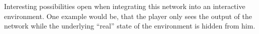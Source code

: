 \documentclass[a4paper, twoside, 10pt]{report}
\begin{document}
Interesting possibilities open when integrating this network into an interactive environment. One example would be, that the player only sees the output of the network while the underlying “real” state of the environment is hidden from him.

%
%
%
%
%
%
\clearpage
\end{document}
